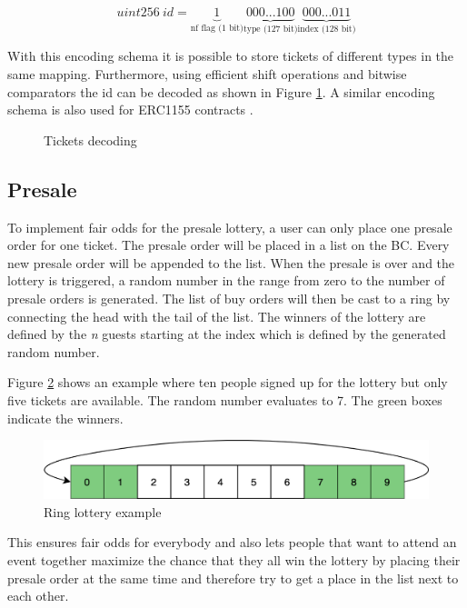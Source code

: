 \[
    uint256\ id = 
    \underbrace{1}_\text{nf flag (1 bit)}
    \underbrace{000...100}_\text{type (127 bit)}
    \underbrace{000...011}_\text{index (128 bit)}
 \]
 
With this encoding schema it is possible to store tickets of different types in the same mapping. Furthermore, using efficient shift operations and bitwise comparators the id can be decoded as shown in Figure \ref{code:tickets-decoding}. A similar encoding schema is also used for ERC1155 contracts \cite{erc1155}.


\begin{figure}[hbt]
    
    \caption{Tickets decoding}
    \label{code:tickets-decoding}
\end{figure}


\subsection{Presale}\label{section:imp:presale}
To implement fair odds for the presale lottery, a user can only place one presale order for one ticket. The presale order will be placed in a list on the BC. Every new presale order will be appended to the list. When the presale is over and the lottery is triggered, a random number in the range from zero to the number of presale orders is generated. The list of buy orders will then be cast to a ring by connecting the head with the tail of the list. The winners of the lottery are defined by the \textit{n} guests starting at the index which is defined by the generated random number.

Figure \ref{fig:ring-lottery} shows an example where ten people signed up for the lottery but only five tickets are available. The random number evaluates to 7. The green boxes indicate the winners. 

\begin{figure}[hbt]
    \centering
    \includegraphics[width=14cm]{images/lottery.png}
    \caption{Ring lottery example}
    \label{fig:ring-lottery}
\end{figure}

This ensures fair odds for everybody and also lets people that want to attend an event together maximize the chance that they all win the lottery by placing their presale order at the same time and therefore try to get a place in the list next to each other.

